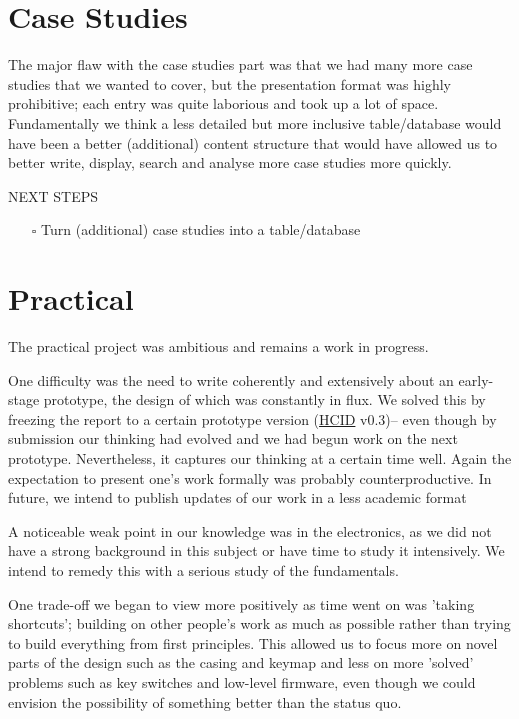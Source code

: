 \documentclass[logo,bsc,singlespacing,parskip]{infthesis}
\begin{document}
\section*{Case Studies}
\label{sec:org131877c}
The major flaw with the case studies part was that we had many more case studies that we wanted to cover, but the presentation format was highly prohibitive; each entry was quite laborious and took up a lot of space.
Fundamentally we think a less detailed but more inclusive table/database would have been a better (additional) content structure that would have allowed us to better write, display, search and analyse more case studies more quickly.

\begin{mdframed}
\begin{description}
\item[{NEXT STEPS}] 
\end{description}


\begin{itemize}
\item[{$\square$}] Turn (additional) case studies into a table/database
\end{itemize}
\end{mdframed}

\section*{Practical}
\label{sec:orgf26409e}
The practical project was ambitious and remains a work in progress.

One difficulty was the need to write coherently and extensively about an early-stage prototype, the design of which was constantly in flux.
We solved this by freezing the report to a certain prototype version (\hyperref[org0c83164]{HCID} v0.3)-- even though by submission our thinking had evolved and we had begun work on the next prototype.
Nevertheless, it captures our thinking at a certain time well.
Again the expectation to present one's work formally was probably counterproductive.
In future, we intend to publish updates of our work in a less academic format

A noticeable weak point in our knowledge was in the electronics, as we did not have a strong background in this subject or have time to study it intensively.
We intend to remedy this with a serious study of the fundamentals.

One trade-off we began to view more positively as time went on was 'taking shortcuts'; building on other people's work as much as possible rather than trying to build everything from first principles.
This allowed us to focus more on novel parts of the design such as the casing and keymap and less on more 'solved' problems such as key switches and low-level firmware, even though we could envision the possibility of something better than the status quo.
\end{document}
